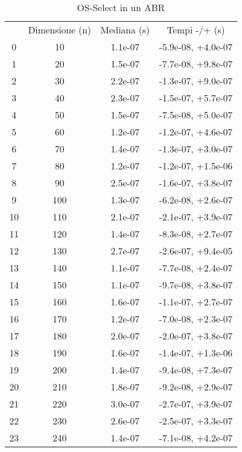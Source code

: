 \begin{table}
\centering
\caption{OS-Select in un ABR}
\label{OS-Select in un ABR}
\begin{adjustbox}{width=1\textwidth/2}
\begin{tabular}{|c|c|c|c|}
\hline
 & Dimensione (n) & Mediana (s) & Tempi -/+ (s) \\
0 & 10 & 1.1e-07 & -5.9e-08, +4.0e-07 \\
\cline{1-4}
1 & 20 & 1.5e-07 & -7.7e-08, +9.8e-07 \\
\cline{1-4}
2 & 30 & 2.2e-07 & -1.3e-07, +9.0e-07 \\
\cline{1-4}
3 & 40 & 2.3e-07 & -1.5e-07, +5.7e-07 \\
\cline{1-4}
4 & 50 & 1.5e-07 & -7.5e-08, +5.0e-07 \\
\cline{1-4}
5 & 60 & 1.2e-07 & -1.2e-07, +4.6e-07 \\
\cline{1-4}
6 & 70 & 1.4e-07 & -1.3e-07, +3.0e-07 \\
\cline{1-4}
7 & 80 & 1.2e-07 & -1.2e-07, +1.5e-06 \\
\cline{1-4}
8 & 90 & 2.5e-07 & -1.6e-07, +3.8e-07 \\
\cline{1-4}
9 & 100 & 1.3e-07 & -6.2e-08, +2.6e-07 \\
\cline{1-4}
10 & 110 & 2.1e-07 & -2.1e-07, +3.9e-07 \\
\cline{1-4}
11 & 120 & 1.4e-07 & -8.3e-08, +2.7e-07 \\
\cline{1-4}
12 & 130 & 2.7e-07 & -2.6e-07, +9.4e-05 \\
\cline{1-4}
13 & 140 & 1.1e-07 & -7.7e-08, +2.4e-07 \\
\cline{1-4}
14 & 150 & 1.1e-07 & -9.7e-08, +3.8e-07 \\
\cline{1-4}
15 & 160 & 1.6e-07 & -1.1e-07, +2.7e-07 \\
\cline{1-4}
16 & 170 & 1.2e-07 & -7.0e-08, +2.3e-07 \\
\cline{1-4}
17 & 180 & 2.0e-07 & -2.0e-07, +3.8e-07 \\
\cline{1-4}
18 & 190 & 1.6e-07 & -1.4e-07, +1.3e-06 \\
\cline{1-4}
19 & 200 & 1.4e-07 & -9.4e-08, +7.3e-07 \\
\cline{1-4}
20 & 210 & 1.8e-07 & -9.2e-08, +2.9e-07 \\
\cline{1-4}
21 & 220 & 3.0e-07 & -2.7e-07, +3.9e-07 \\
\cline{1-4}
22 & 230 & 2.6e-07 & -2.5e-07, +3.3e-07 \\
\cline{1-4}
23 & 240 & 1.4e-07 & -7.1e-08, +4.2e-07 \\

\end{tabular}
\end{adjustbox}
\end{table}
